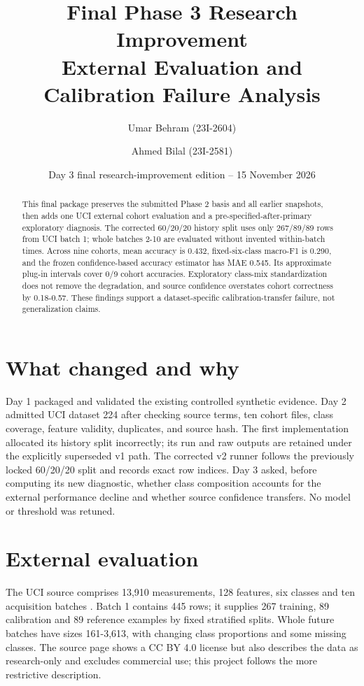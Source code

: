 \documentclass[10pt]{article}
\title{Final Phase 3 Research Improvement\\External Evaluation and Calibration Failure Analysis}
\author{Umar Behram (23I-2604) \and Ahmed Bilal (23I-2581)}
\date{Day 3 final research-improvement edition -- 15 November 2026}
\begin{document}
\maketitle
\begin{abstract}
This final package preserves the submitted Phase 2 basis and all earlier snapshots, then adds one UCI external cohort evaluation and a pre-specified-after-primary exploratory diagnosis. The corrected 60/20/20 history split uses only 267/89/89 rows from UCI batch 1; whole batches 2-10 are evaluated without invented within-batch times. Across nine cohorts, mean accuracy is 0.432, fixed-six-class macro-F1 is 0.290, and the frozen confidence-based accuracy estimator has MAE 0.545. Its approximate plug-in intervals cover 0/9 cohort accuracies. Exploratory class-mix standardization does not remove the degradation, and source confidence overstates cohort correctness by 0.18-0.57. These findings support a dataset-specific calibration-transfer failure, not generalization claims.
\end{abstract}

\section{What changed and why}
Day 1 packaged and validated the existing controlled synthetic evidence. Day 2 admitted UCI dataset 224 after checking source terms, ten cohort files, class coverage, feature validity, duplicates, and source hash. The first implementation allocated its history split incorrectly; its run and raw outputs are retained under the explicitly superseded v1 path. The corrected v2 runner follows the previously locked 60/20/20 split and records exact row indices. Day 3 asked, before computing its new diagnostic, whether class composition accounts for the external performance decline and whether source confidence transfers. No model or threshold was retuned.

\section{External evaluation}
The UCI source comprises 13,910 measurements, 128 features, six classes and ten acquisition batches \cite{uci224}. Batch 1 contains 445 rows; it supplies 267 training, 89 calibration and 89 reference examples by fixed stratified splits. Whole future batches have sizes 161-3,613, with changing class proportions and some missing classes. The source page shows a CC BY 4.0 license but also describes the data as research-only and excludes commercial use; this project follows the more restrictive description.
\end{document}
